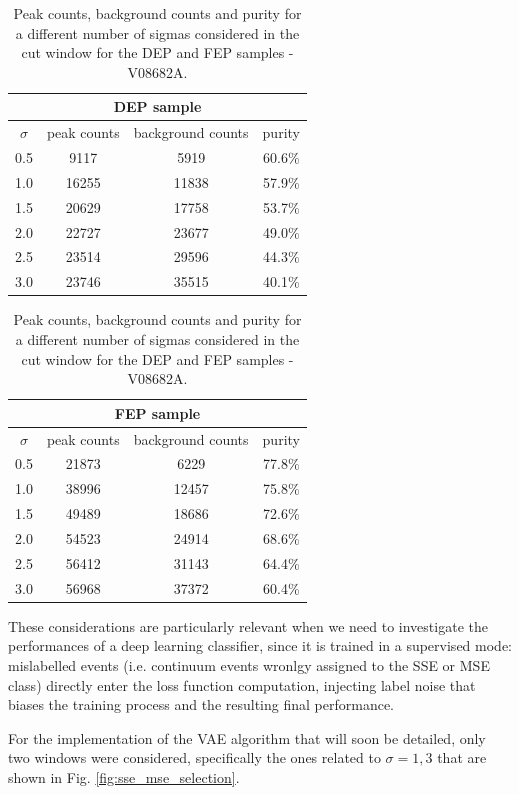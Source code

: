 \begin{table}[H]
\centering
\begin{minipage}{0.48\textwidth}
\centering
\begin{tabular}{cccc}
\toprule
\multicolumn{4}{c}{\ac{DEP} sample} \\
\toprule
$\sigma$ & peak counts & background counts & purity \\
\midrule
0.5 & 9117  & 5919  & 60.6\% \\
1.0 & 16255 & 11838 & 57.9\% \\
1.5 & 20629 & 17758 & 53.7\% \\
2.0 & 22727 & 23677 & 49.0\% \\
2.5 & 23514 & 29596 & 44.3\% \\
3.0 & 23746 & 35515 & 40.1\% \\
\bottomrule
\end{tabular}
\end{minipage}
\hfill
\begin{minipage}{0.48\textwidth}
\centering
\begin{tabular}{cccc}
\toprule
\multicolumn{4}{c}{\ac{FEP} sample} \\
\toprule
$\sigma$ & peak counts & background counts & purity \\
\midrule
0.5 & 21873 & 6229  & 77.8\% \\
1.0 & 38996 & 12457 & 75.8\% \\
1.5 & 49489 & 18686 & 72.6\% \\
2.0 & 54523 & 24914 & 68.6\% \\
2.5 & 56412 & 31143 & 64.4\% \\
3.0 & 56968 & 37372 & 60.4\% \\
\bottomrule
\end{tabular}
\end{minipage}
\caption{Peak counts, background counts and purity for a different number of sigmas considered in the cut window for the \ac{DEP} and \ac{FEP} samples - V08682A.}
\label{tab:purity}
\end{table}
These considerations are particularly relevant when we need to investigate the performances of a deep learning classifier, since it is trained in a supervised mode: mislabelled events (i.e. continuum events wronlgy assigned to the \ac{SSE} or \ac{MSE} class) directly enter the loss function computation, injecting label noise that biases the training process and the resulting final performance.

For the implementation of the \ac{VAE} algorithm that will soon be detailed, only two windows were considered, specifically the ones related to $\sigma = 1, 3$ that are shown in Fig. \ref{fig:sse_mse_selection}.

